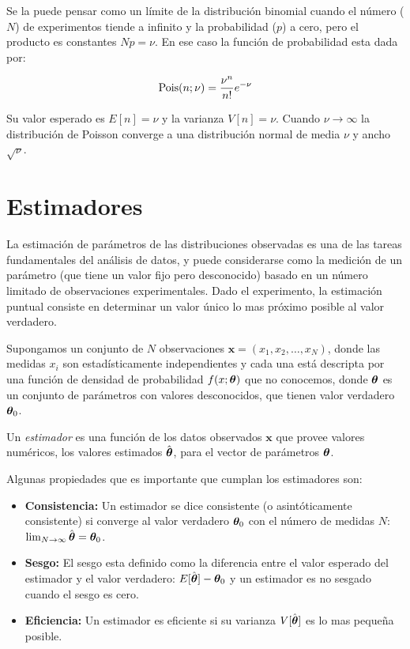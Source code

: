Se la puede pensar como un límite de la distribución binomial cuando el número ($N$)
de experimentos tiende a infinito y la probabilidad ($p$) a cero, pero el producto es
constantes $Np = \nu$. En ese caso la función de probabilidad esta dada por:

\begin{equation}
  \operatorname{Pois}(n;\nu) = \frac{\nu^n}{n!} e^{-\nu}
\end{equation}

Su valor esperado es $E[n] = \nu$ y la varianza $V[n] = \nu$.
Cuando $\nu \to \infty$ la distribución de Poisson converge a una distribución
normal de media $\nu$ y ancho $\sqrt{\nu}$.


\section{Estimadores}

La estimación de parámetros de las distribuciones observadas es una de las
tareas fundamentales del análisis de datos, y puede considerarse como la
medición de un parámetro (que tiene un valor fijo pero desconocido) basado en un
número limitado de observaciones experimentales. Dado el experimento, la
estimación puntual consiste en determinar un valor único lo mas próximo posible al
valor verdadero.

Supongamos un conjunto de $N$ observaciones $\bm{x} = (x_1, x_2, \ldots, x_N)$,
donde las medidas $x_i$ son estadísticamente independientes y cada una está
descripta por una función de densidad de probabilidad $f(x;\bm{\theta})$ que no
conocemos, donde $\bm{\theta}$ es un conjunto de parámetros con valores
desconocidos, que tienen valor verdadero $\bm{\theta}_0$.

Un \emph{estimador} es una función de los datos observados $\bm{x}$ que provee
valores numéricos, los valores estimados $\hat{\bm{\theta}}$, para el vector de
parámetros $\bm{\theta}$.

Algunas propiedades que es importante que cumplan los estimadores son:

\begin{itemize}\itemsep0.2cm\parskip0.2cm
\item {\bf Consistencia:} Un estimador se dice consistente (o asintóticamente
  consistente) si converge al valor verdadero $\bm{\theta}_{0}$ con el número de
  medidas $N$: $\lim_{N \rightarrow \infty} \hat{\bm{\theta}} = \bm{\theta}_0$.

\item {\bf Sesgo:} El sesgo esta definido como la diferencia entre el valor
  esperado del estimador y el valor verdadero: $E[\hat{\bm{\theta}}] - \bm{\theta}_0$ y
  un estimador es no sesgado cuando el sesgo es cero.

\item {\bf Eficiencia:} Un estimador es eficiente si su varianza
  $V[\hat{\bm{\theta}}]$ es lo mas peque\~na posible.
\end{itemize}

